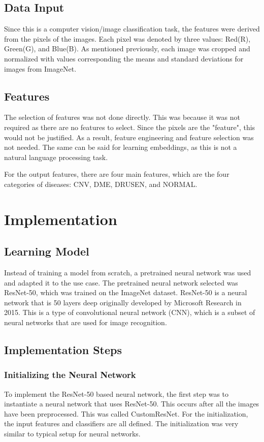 \documentclass[11pt]{article}
\begin{document}
\subsection{Data Input}
Since this is a computer vision/image classification task, the features were derived from the pixels of the images. Each pixel was denoted by three values: Red(R), Green(G), and Blue(B). As mentioned previously, each image was cropped and normalized with values corresponding the means and standard deviations for images from ImageNet.

\subsection{Features}
The selection of features was not done directly. This was because it was not required as there are no features to select. Since the pixels are the "feature", this would not be justified. As a result, feature engineering and feature selection was not needed. The same can be said for learning embeddings, as this is not a natural language processing task.

For the output features, there are four main features, which are the four categories of diseases: CNV, DME, DRUSEN, and NORMAL.

\section{Implementation}

\subsection{Learning Model}
Instead of training a model from scratch, a pretrained neural network was used and adapted it to the use case. The pretrained neural network selected was ResNet-50, which was trained on the ImageNet dataset. ResNet-50 is a neural network that is 50 layers deep originally developed by Microsoft Research in 2015. This is a type of convolutional neural network (CNN), which is a subset of neural networks that are used for image recognition.

\subsection{Implementation Steps}

\subsubsection{Initializing the Neural Network}
To implement the ResNet-50 based neural network, the first step was to instantiate a neural network that uses ResNet-50. This occurs after all the images have been preprocessed. This was called CustomResNet. For the initialization, the input features and classifiers are all defined. The initialization was very similar to typical setup for neural networks.
\end{document}
